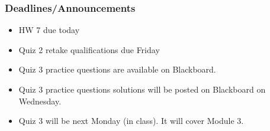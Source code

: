 \begin{frame}
    \frametitle{Deadlines/Announcements}
    \begin{itemize}
        \item HW 7 due today
         \item Quiz 2 retake qualifications due Friday 
         \item Quiz 3 practice questions are available on Blackboard.
         \item Quiz 3 practice questions solutions will be posted on Blackboard on Wednesday.
         \item Quiz 3 will be next Monday (in class). It will cover Module 3.
    \end{itemize}
\end{frame}

